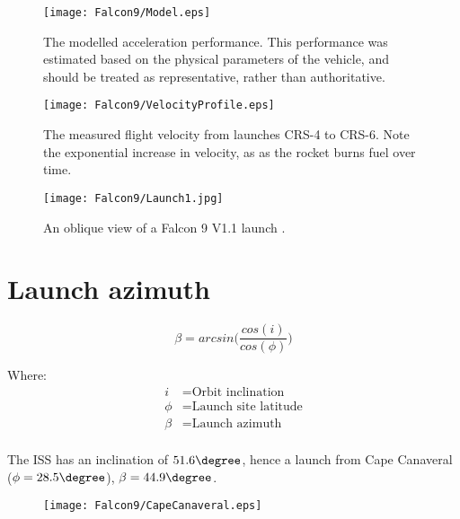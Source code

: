 \begin{figure}[!htb] 
    \centering
    \texttt{[image: Falcon9/Model.eps]}
    \caption{The modelled acceleration performance. This performance was estimated based on the physical parameters of the vehicle, and should be treated as representative, rather than authoritative.}
    \label{fig:Falcon9Model}
\end{figure}


\begin{figure}[!htb] 
    \centering
    \texttt{[image: Falcon9/VelocityProfile.eps]}
    \caption{The measured flight velocity from launches CRS-4 to CRS-6. Note the exponential increase in velocity, as as the rocket burns fuel over time.}
    \label{fig:Falcon9VelocityProfile}
\end{figure}



\begin{figure}[!htb] 
    \centering
    \texttt{[image: Falcon9/Launch1.jpg]}
    \caption{An oblique view of a Falcon 9 V1.1 launch \cite{SpaceXPhotos}.}
    \label{fig:Falcon9Launch}
\end{figure}

\clearpage
\section{Launch azimuth}

\begin{equation}
\beta = arcsin \Big(\frac{cos(i)}{cos(\phi)}\Big)
\end{equation}

Where:
\begin{align*}
 i &= \text{Orbit inclination}\\
 \phi &= \text{Launch site latitude}\\
 \beta &= \text{Launch azimuth}\\
\end{align*}


The \ac{ISS} has an inclination of $51.6\degree$, hence a launch from Cape Canaveral ($\phi = 28.5\degree$), $\beta=44.9\degree$\cite{LaunchDesign}.


\begin{figure}[!htb] 
    \centering
    \texttt{[image: Falcon9/CapeCanaveral.eps]}
    \caption{}
    \label{fig:LaunchPath}
\end{figure}


\begin{comment}
\begin{figure}[!htb] 
    \centering
    \texttt{[image: Falcon9/Skyplot.pdf]}
    \caption{}
    \label{fig:Skyplot}
\end{figure}
\end{comment}

